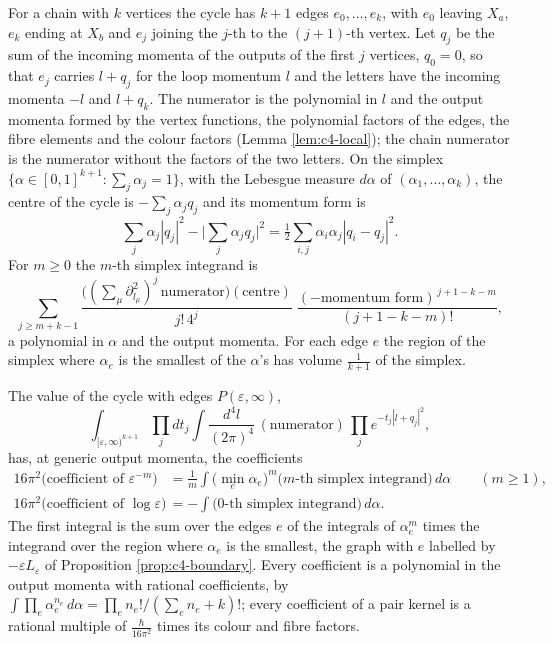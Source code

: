 \begin{definition}
\label{def:c10-cycle}
For a chain with $k$ vertices the cycle has $k+1$ edges $e_0,\dots,e_k$, with $e_0$ leaving $X_a$, $e_k$ ending at $X_b$ and $e_j$ joining the $j$-th to the $(j+1)$-th vertex. Let $q_j$ be the sum of the incoming momenta of the outputs of the first $j$ vertices, $q_0=0$, so that $e_j$ carries $l+q_j$ for the loop momentum $l$ and the letters have the incoming momenta $-l$ and $l+q_k$. The numerator is the polynomial in $l$ and the output momenta formed by the vertex functions, the polynomial factors of the edges, the fibre elements and the colour factors (Lemma \ref{lem:c4-local}); the chain numerator is the numerator without the factors of the two letters. On the simplex $\{\alpha\in[0,1]^{k+1}:\sum_j\alpha_j=1\}$, with the Lebesgue measure $d\alpha$ of $(\alpha_1,\dots,\alpha_k)$, the centre of the cycle is $-\sum_j\alpha_jq_j$ and its momentum form is
\[
\sum_j\alpha_j|q_j|^2-\Big|\sum_j\alpha_jq_j\Big|^2=\tfrac12\sum_{i,j}\alpha_i\alpha_j|q_i-q_j|^2 .
\]
For $m\ge0$ the $m$-th simplex integrand is
\[
\sum_{j\ge m+k-1}\frac{\big((\textstyle\sum_\mu\partial^2_{l_\mu})^j\,\text{numerator}\big)(\text{centre})}{j!\,4^j}\;\frac{(-\text{momentum form})^{\,j+1-k-m}}{(j+1-k-m)!},
\]
a polynomial in $\alpha$ and the output momenta. For each edge $e$ the region of the simplex where $\alpha_e$ is the smallest of the $\alpha$'s has volume $\frac1{k+1}$ of the simplex.
\end{definition}

\begin{theorem}
\label{thm:c10-simplex}
The value of the cycle with edges $P(\varepsilon,\infty)$,
\[
\int_{[\varepsilon,\infty)^{k+1}}\prod_jdt_j\int\frac{d^4l}{(2\pi)^4}\,(\text{numerator})\,\prod_je^{-t_j|l+q_j|^2},
\]
has, at generic output momenta, the coefficients
\begin{equation}
\begin{aligned}
16\pi^2\big(\text{coefficient of }\varepsilon^{-m}\big)&=\frac1m\int\big(\min_e\alpha_e\big)^m\big(m\text{-th simplex integrand}\big)\,d\alpha\qquad(m\ge1),\\
16\pi^2\big(\text{coefficient of }\log\varepsilon\big)&=-\int\big(0\text{-th simplex integrand}\big)\,d\alpha .
\end{aligned}
\label{eq:c10-simplex}
\end{equation}
The first integral is the sum over the edges $e$ of the integrals of $\alpha_e^m$ times the integrand over the region where $\alpha_e$ is the smallest, the graph with $e$ labelled by $-\varepsilon L_\varepsilon$ of Proposition \ref{prop:c4-boundary}. Every coefficient is a polynomial in the output momenta with rational coefficients, by $\int\prod_e\alpha_e^{n_e}\,d\alpha=\prod_en_e!/(\sum_en_e+k)!$; every coefficient of a pair kernel is a rational multiple of $\frac{\hbar}{16\pi^2}$ times its colour and fibre factors.
\end{theorem}

